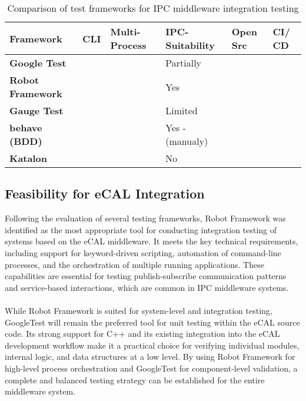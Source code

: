 \begin{table}[H]
	\centering
	\renewcommand{\arraystretch}{1.4}
	\begin{tabular}{|p{2.31cm}|p{1cm}|p{1.7cm}|p{2.3cm}|p{1cm}|p{1cm}|}
		\hline
		\textbf{Framework} & \textbf{CLI} & \textbf{Multi-Process} & \textbf{IPC-Suitability} & \textbf{Open Src} & \textbf{CI/ CD} \\
		\hline
		\textbf{Google Test}            & \cmark & \xmark & Partially         & \cmark & \cmark \\
		\hline
		\textbf{Robot Framework}    & \cmark & \cmark & Yes               & \cmark & \cmark \\
		\hline
		\textbf{Gauge Test}  & \cmark & \xmark & Limited           & \cmark & \cmark \\
		\hline
		\textbf{behave (BDD)}  & \cmark & \xmark & Yes -(manualy)      & \cmark & \cmark \\
		\hline
		\textbf{Katalon}   & \xmark & \xmark & No                & \xmark & \xmark \\
		\hline
	\end{tabular}
	\caption{Comparison of test frameworks for IPC middleware integration testing}
	\label{tab:framework_comparison_extended}
\end{table}

\subsection{Feasibility for eCAL Integration}

Following the evaluation of several testing frameworks, Robot Framework was identified as the most appropriate tool for conducting integration testing of systems based on the eCAL middleware. It meets the key technical requirements, including support for keyword-driven scripting, automation of command-line processes, and the orchestration of multiple running applications. These capabilities are essential for testing publish-subscribe communication patterns and service-based interactions, which are common in IPC middleware systems.
\\
\\
While Robot Framework is suited for system-level and integration testing, GoogleTest will remain the preferred tool for unit testing within the eCAL source code. Its strong support for C++ and its existing integration into the eCAL development workflow make it a practical choice for verifying individual modules, internal logic, and data structures at a low level. By using Robot Framework for high-level process orchestration and GoogleTest for component-level validation, a complete and balanced testing strategy can be established for the entire middleware system.

